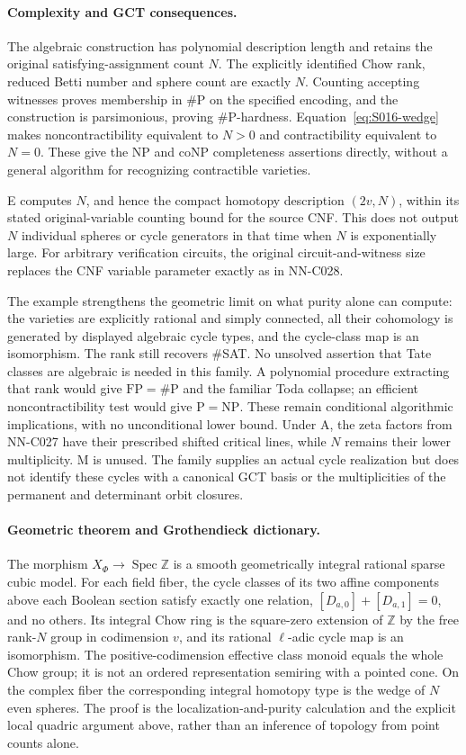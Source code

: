 \paragraph{Complexity and GCT consequences.}
The algebraic construction has polynomial description length and retains
the original satisfying-assignment count $N$. The explicitly identified
Chow rank, reduced Betti number and sphere count are exactly $N$.
Counting accepting witnesses proves membership in \#P on the specified
encoding, and the construction is parsimonious, proving \#P-hardness.
Equation~\eqref{eq:S016-wedge} makes noncontractibility equivalent to
$N>0$ and contractibility equivalent to $N=0$. These give the NP and
coNP completeness assertions directly, without a general algorithm
for recognizing contractible varieties.

E computes $N$, and hence the compact homotopy description $(2v,N)$,
within its stated original-variable counting bound for the source CNF.
This does not output $N$ individual spheres or cycle generators in that
time when $N$ is exponentially large. For arbitrary verification circuits,
the original circuit-and-witness size replaces the CNF variable parameter
exactly as in NN-C028.

The example strengthens the geometric limit on what purity alone can
compute: the varieties are explicitly rational and simply connected,
all their cohomology is generated by displayed algebraic cycle types,
and the cycle-class map is an isomorphism. The rank still recovers \#SAT.
No unsolved assertion that Tate classes are algebraic is needed in this
family. A polynomial procedure extracting that rank would give
$\mathrm{FP}=\#\mathrm P$ and the familiar Toda collapse; an efficient
noncontractibility test would give $\mathrm P=\mathrm{NP}$. These remain
conditional algorithmic implications, with no unconditional lower bound.
Under A, the zeta factors from NN-C027 have their prescribed shifted
critical lines, while $N$ remains their lower multiplicity. M is unused.
The family supplies an actual cycle realization but does not identify
these cycles with a canonical GCT basis or the multiplicities of the
permanent and determinant orbit closures.

\paragraph{Geometric theorem and Grothendieck dictionary.}
The morphism $X_\Phi\to\operatorname{Spec}\mathbb Z$ is a smooth
geometrically integral rational sparse cubic model. For each field fiber,
the cycle classes of its two affine components above each Boolean section
satisfy exactly one relation, $[D_{a,0}]+[D_{a,1}]=0$, and no others.
Its integral Chow ring is the square-zero extension of $\mathbb Z$ by
the free rank-$N$ group in codimension $v$, and its rational $\ell$-adic
cycle map is an isomorphism. The positive-codimension effective class
monoid equals the whole Chow group; it is not an ordered representation
semiring with a pointed cone. On the complex fiber the corresponding
integral homotopy type is the wedge of $N$ even spheres. The proof is
the localization-and-purity calculation and the explicit local
quadric argument above, rather than an inference of topology from
point counts alone.

